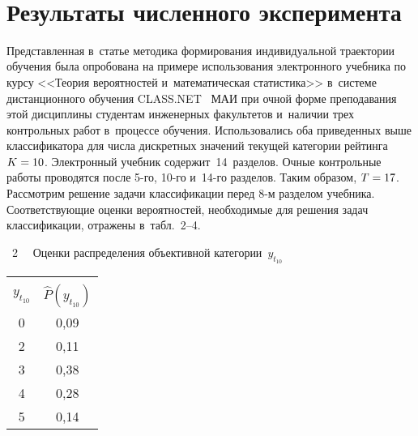 \begin{multicols}{2}
\begin{figure*} %
\vspace*{6pt}
 \begin{center}
 \mbox{%
 \epsfxsize=122.528mm 
 }
 \end{center}
   \vspace*{-9pt}
\end{figure*}

\vspace*{-4pt}

\section{Результаты численного эксперимента}

\vspace*{-2pt}

      Представленная в~статье методика формирования индивидуальной траектории 
обучения была опробована на примере использования электронного учебника по курсу 
<<Теория вероятностей и~математическая статистика>> в~системе дистанционного 
обучения CLASS.NET~\cite{16-bos} МАИ при очной форме преподавания этой 
дисциплины студентам инженерных факультетов и~наличии трех контрольных работ 
в~процессе обучения. Использовались оба приведенных выше классификатора для числа 
дискретных значений текущей категории рейтинга $K\hm=10$. Электронный учебник 
содержит~14~разделов. Очные контрольные работы проводятся после 5-го, 10-го и~14-го 
разделов. Таким образом, $T\hm=17$. Рассмотрим решение задачи классификации перед 
8-м разделом учебника. Соответствующие оценки вероятностей, необходимые для 
решения задач классификации, отражены в~табл.~2--4.
      


{   %
 \begin{center}
 \vspace*{6pt}
 
\noindent
\parbox{40mm}{{{\tablename~2}\ \ \small{
Оценки распределения объективной категории~$y_{t_{10}}$
}}}

\vspace*{6pt}




{\small    
      
      \tabcolsep=17pt
      \begin{tabular}{|c|c|}
\hline
&\\[-9pt]
$y_{t_{10}}$&$\hat{P}(y_{t_{10}})$\\ 
\hline 
0&0,09\\ 
2&0,11\\ 
3&0,38\\ 
4&0,28\\ 
5&0,14\\ 
\hline
\end{tabular} 
}
\end{center}

}
\end{multicols}
